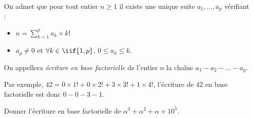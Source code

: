 \exer{[NBR-005]}
\setcounter{numques}{0}~\\

On admet que pour tout entier $n\geq 1$ il existe une unique suite $a_1,\dots,a_p$ vérifiant : 
\begin{itemize}
    \item $n = \displaystyle\sum_{k=1}^p a_k\times k!$ 
    \item $a_p \neq 0$ et $\forall k \in \iif{1,p}$, $0 \leq a_k \leq k$.
\end{itemize}
On appellera \emph{écriture en base factorielle} de l'entier $n$ la chaîne $a_1-a_2-\dots-a_p$.

\medskip{}

Par exemple, $42 = 0\times 1! + 0 \times 2! + 3 \times 3! + 1 \times 4!$, l'écriture de $42$ en base factorielle est donc $0-0-3-1$. 

\medskip{}

\question{} Donner l'écriture en base factorielle de $\alpha^3+\alpha^2+\alpha + 10^5$.
